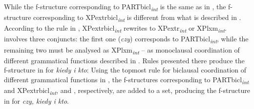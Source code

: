 \documentclass[output=paper]{../langscibook}
\begin{document}
While the f-structure corresponding to PARTbicl\textsubscript{\textit{int}} is the same as
in
,
the f-structure corresponding to XPextrbicl\textsubscript{\textit{int}} is different from
what is described in . According to
the rule in , XPextrbicl\textsubscript{\textit{int}} rewrites to
XPextr\textsubscript{\textit{int}} or XPlxm\textsubscript{\textit{int}}.  involves three
conjuncts: the first one (\emph{czy}) corresponds to PARTbicl\textsubscript{\textit{int}}, while the
remaining two must be analysed as XPlxm\textsubscript{\textit{int}} – as monoclausal
coordination of different grammatical functions described in
. Rules presented there produce the f-structure
in  for
\emph{kiedy i kto}:
Using the topmost rule for biclausal coordination of different
grammatical functions in , the f-structures
corresponding to PARTbicl\textsubscript{\textit{int}} and XPextrbicl\textsubscript{\textit{int}},
and ,
respectively, are added to a set, producing the f-structure in
 for \emph{czy,
  kiedy i kto}.
\end{document}
